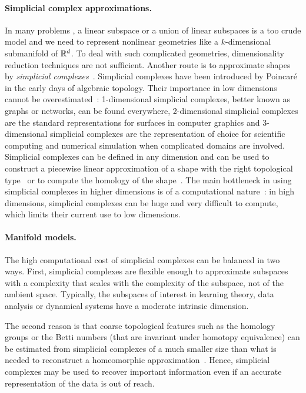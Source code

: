 \paragraph{Simplicial complex approximations.}
In many problems , a linear subspace or a union of linear subspaces is a too crude model and we need to represent nonlinear geometries like a $k$-dimensional submanifold of $\mathbb R^d$.  To deal with such complicated geometries, dimensionality reduction techniques are not sufficient. Another route is to approximate shapes by {\em simplicial complexes}~\cite{hh-ct-2010}.  Simplicial complexes have been introduced by Poincar\'e in the early days of algebraic topology. Their importance in low dimensions cannot be overestimated~: 1-dimensional simplicial complexes, better known as graphs or networks, can be found everywhere, 2-dimensional simplicial complexes are the standard representations for surfaces in computer graphics and 3-dimensional simplicial complexes are the representation of choice for scientific computing and numerical simulation when complicated domains are involved. Simplicial complexes can be defined in any dimension and can be used to construct a piecewise linear approximation of a shape with the right topological type~\cite{geometrica-7142i} or to 
compute the homology of the shape~\cite{hh-ct-2010}. The main bottleneck in using simplicial complexes in higher dimensions is of a computational nature~:  in high dimensions, simplicial complexes can be huge and very difficult to compute, which limits their current use to low dimensions.

\paragraph{Manifold models.}
The high computational cost of simplicial complexes can be balanced in two ways. First, simplicial complexes are flexible enough to approximate subspaces with a complexity that scales with the complexity of the subspace, not of the ambient space. Typically, the subspaces of interest 
 in learning theory, data analysis or dynamical systems have a moderate  intrinsic dimension.

The second reason is that coarse topological features such as the homology groups or the Betti numbers (that are invariant under homotopy equivalence) can be estimated from simplicial complexes of a much smaller size than what is needed to reconstruct a homeomorphic approximation~\cite{co-tpr-2008}. Hence, simplicial complexes may be used to recover important information even if an accurate representation of the data is out of reach.

